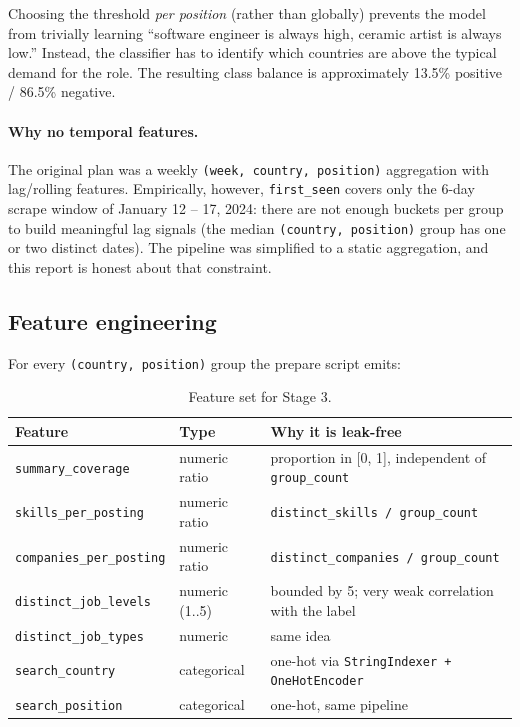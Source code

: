 \documentclass[11pt,a4paper]{article}
\begin{document}
Choosing the threshold \emph{per position} (rather than globally)
prevents the model from trivially learning ``software engineer is
always high, ceramic artist is always low.''  Instead, the classifier
has to identify which countries are above the typical demand for the
role.  The resulting class balance is approximately 13.5\% positive
/ 86.5\% negative.

\paragraph{Why no temporal features.}  The original plan was a weekly
\texttt{(week, country, position)} aggregation with lag/rolling
features.  Empirically, however, \texttt{first\_seen} covers only the
6-day scrape window of January 12 -- 17, 2024: there are not enough
buckets per group to build meaningful lag signals (the median
\texttt{(country, position)} group has one or two distinct dates).
The pipeline was simplified to a static aggregation, and this report
is honest about that constraint.

\subsection{Feature engineering}
For every \texttt{(country, position)} group the prepare script emits:

\begin{table}[h]
\centering
\caption{Feature set for Stage 3.}
\label{tab:features}
\small
\begin{tabularx}{\linewidth}{l l X}
\toprule
\textbf{Feature} & \textbf{Type} & \textbf{Why it is leak-free} \\
\midrule
\texttt{summary\_coverage}     & numeric ratio & proportion in [0, 1], independent of \texttt{group\_count} \\
\texttt{skills\_per\_posting}  & numeric ratio & \texttt{distinct\_skills / group\_count} \\
\texttt{companies\_per\_posting}& numeric ratio& \texttt{distinct\_companies / group\_count} \\
\texttt{distinct\_job\_levels} & numeric (1..5)& bounded by 5; very weak correlation with the label \\
\texttt{distinct\_job\_types}  & numeric       & same idea \\
\texttt{search\_country}       & categorical   & one-hot via \texttt{StringIndexer + OneHotEncoder} \\
\texttt{search\_position}      & categorical   & one-hot, same pipeline \\
\bottomrule
\end{tabularx}
\end{table}
\end{document}

